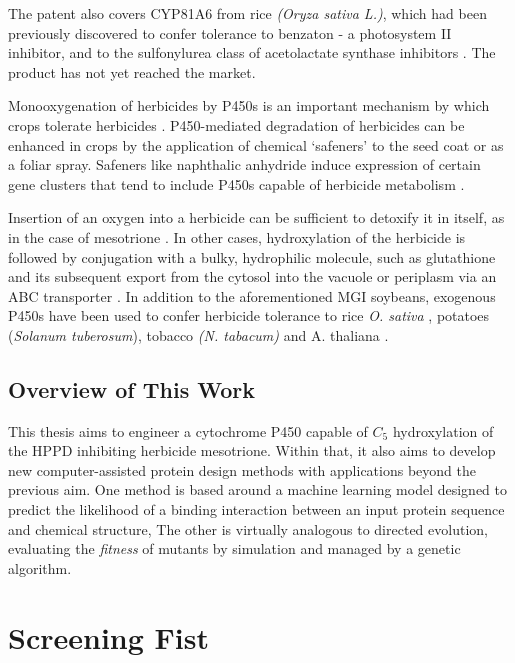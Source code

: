 \documentclass[16pt]{book}
\begin{document}
 
 The patent also covers CYP81A6 from rice \textit{(Oryza sativa L.)}, 
 which had been previously discovered to confer tolerance to benzaton - a photosystem II inhibitor, and to the sulfonylurea class of acetolactate synthase inhibitors \cite{zhang2007identification}. 
 The product has not yet reached the market.



Monooxygenation of herbicides by P450s is an important mechanism by which crops tolerate herbicides \cite{siminszky2006plant}. 
P450-mediated degradation of herbicides can be enhanced in crops by the application of chemical ‘safeners’ to the seed coat or as a foliar spray. 
Safeners like naphthalic anhydride induce expression of certain gene clusters that tend to include P450s capable of herbicide metabolism \cite{davies1998mode}. 


Insertion of an oxygen into a herbicide can be sufficient to detoxify it in itself, as in the case of mesotrione \cite{kaundun2017mechanism}.
In other cases, hydroxylation of the herbicide is followed by conjugation with a bulky, hydrophilic molecule, such as glutathione and its subsequent export from the cytosol into the vacuole or periplasm via an ABC transporter \cite{yuan2007non}. 
In addition to the aforementioned MGI soybeans, exogenous P450s have been used to confer herbicide tolerance to rice \textit{O. sativa} \cite{kawahigashi2005enhanced}\cite{kawahigashi2008transgenic}, potatoes (\textit{Solanum tuberosum})\cite{inui2005herbicide}, tobacco \textit{(N. tabacum)} and A. thaliana \cite{didierjean2002engineering}.

\section{Overview of This Work}

This thesis aims to engineer a cytochrome P450 capable of $C_5$ hydroxylation of the HPPD inhibiting herbicide mesotrione.
Within that, it also aims to develop new computer-assisted protein design methods with applications beyond the previous aim.
One method is based around a machine learning model designed to predict the likelihood of a binding interaction between an input protein sequence and chemical structure,
The other is virtually analogous to directed evolution, evaluating the \textit{fitness} of mutants by simulation and managed by a genetic algorithm.

\chapter{Screening Fist}
\end{document}
